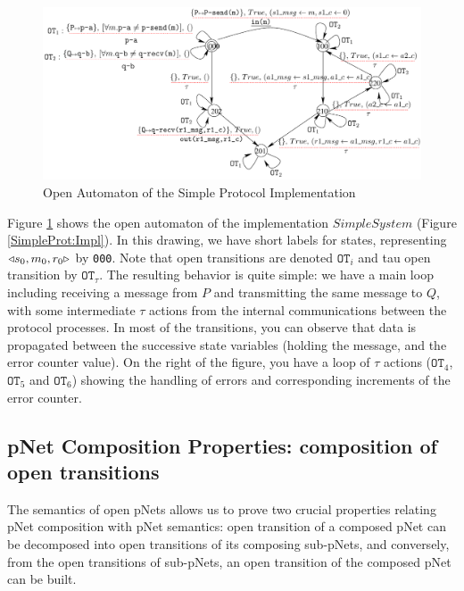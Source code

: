 \documentclass{lmcs}
\begin{document}
 \begin{figure}[ht]
  \centerline{\includegraphics[width=15cm]{XFIG/SPImplOpen}}
  \caption{Open Automaton of the Simple Protocol Implementation}  \label{SimpleProtCounter:ImplOA}
\end{figure}


    Figure \ref{SimpleProtCounter:ImplOA} shows the open automaton of the implementation $SimpleSystem$ (Figure \ref{SimpleProt:Impl}). In this drawing, we have short labels for states, representing $\triangleleft{s_0,m_0,r_0}\triangleright$ by \texttt{000}. Note that open transitions are denoted $\texttt{OT}_i$ and tau open transition by  $\texttt{OT}_{\tau}$. The resulting behavior is quite simple:  we have a main loop including receiving a message from $P$ and transmitting the same message to $Q$, with some intermediate $\tau$ actions from the internal communications between the protocol processes. In most of the transitions, you can observe that data is propagated between the successive state variables (holding the message, and the error counter value). On the right of the figure, you have a loop of $\tau$ actions ($\texttt{OT}_4$, $\texttt{OT}_5$ and $\texttt{OT}_6$)  showing the handling of errors and corresponding increments of the error counter.
    
    
  

\subsection{pNet Composition Properties: composition of open transitions}
The semantics of open pNets allows us to prove two crucial properties relating pNet composition with pNet semantics: open transition of a composed pNet can be decomposed into open transitions of its composing sub-pNets, and conversely, from the open transitions of sub-pNets,  an open transition of the composed pNet can be built.
\end{document}
